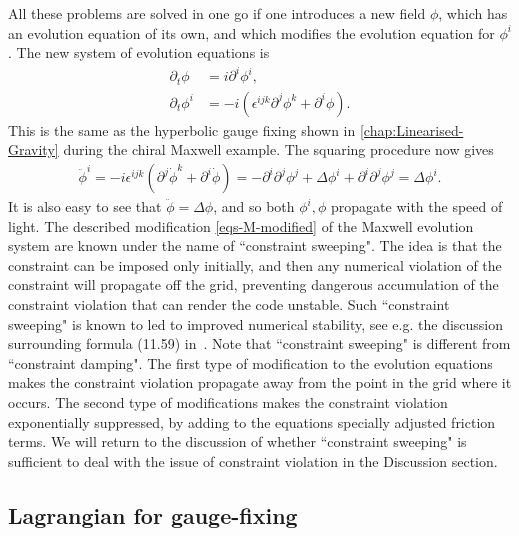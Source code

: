 \documentclass[10pt]{report}
\theoremstyle{definition}
\newcommand{\im}{i}
\begin{document}
All these problems are solved in one go if one introduces a new field $\phi$, which has an evolution equation of its own, and which modifies the evolution equation for $\phi^i$. The new system of evolution equations is
\begin{align}\label{eqs-M-modified}
\partial_t \phi & = \im \partial^i \phi^i, \\ \nonumber
\partial_t \phi^i & = - \im (\epsilon^{ijk} \partial^j \phi^k + \partial^i \phi).
\end{align}
This is the same as the hyperbolic gauge fixing shown in \cref{chap:Linearised-Gravity} during the chiral Maxwell example. The squaring procedure now gives
\begin{align}
\ddot{\phi}^i =- \im \epsilon^{ijk} (\partial^j \dot{\phi}^k + \partial^i \dot{\phi}) = - \partial^i \partial^j \phi^j + \Delta \phi^i + \partial^i \partial^j \phi^j = \Delta \phi^i.
\end{align}
It is also easy to see that $\ddot{\phi} = \Delta\phi$, and so both $\phi^i,\phi$ propagate with the speed of light. The described modification \cref{eqs-M-modified} of the Maxwell evolution system are known under the name of ``constraint sweeping". The idea is that the constraint can be imposed only initially, and then any numerical violation of the constraint will propagate off the grid, preventing dangerous accumulation of the constraint violation that can render the code unstable. Such ``constraint sweeping" is known to led to improved numerical stability, see e.g. the discussion surrounding formula (11.59) in~\cite{NumericalRelatBaumga2010}. Note that ``constraint sweeping" is different from ``constraint damping". The first type of modification to the evolution equations makes the constraint violation propagate away from the point in the grid where it occurs. The second type of modifications makes the constraint violation exponentially suppressed, by adding to the equations specially adjusted friction terms. We will return to the discussion of whether ``constraint sweeping" is sufficient to deal with the issue of constraint violation in the Discussion section.

\subsection{Lagrangian for gauge-fixing}
\end{document}
